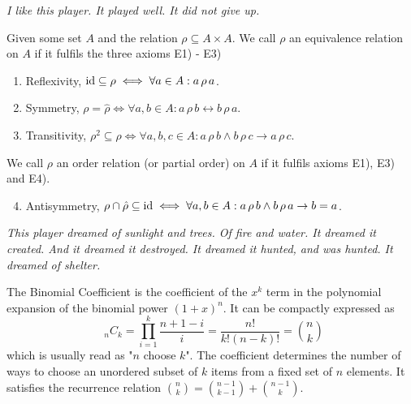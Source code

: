 \bigskip
\textit{I like this player. It played well. It did not give up.}
\bigskip

\begin{tcolorbox}[
	adjusted title=Equivalence Relation, fonttitle=\bfseries,
	boxrule=0mm, leftrule=1mm, arc=0mm, 
	left=1.75mm, toptitle=0.75mm, bottomtitle=0.25mm,
	colframe=brandblue,
	coltitle=textcol, colbacktitle=textcol!10!pagecol,
	coltext=textcol, colback=textcol!5!pagecol,
]
	\def\EAx<#1>{E#1)}
	Given some set $A$ and the relation $\rho\subseteq A\times A$.
	We call $\rho$ an equivalence relation on $A$ if it fulfils the three axioms \EAx<1> - \EAx<3>
	\begin{enumerate}[label=\EAx<\arabic*>]
		\item Reflexivity, $\operatorname{id}\subseteq\rho \iff \forall a\in A: a\,\rho\,a$.
		\item Symmetry, $\rho=\hat\rho \iff \forall a,b\in A: a\,\rho\,b \leftrightarrow b\,\rho\,a$.
		\item Transitivity, $\rho^2\subseteq\rho \iff \forall a,b,c\in A: a\,\rho\,b \land b\,\rho\,c \rightarrow a\,\rho\,c$.
	\end{enumerate}
	We call $\rho$ an order relation (or partial order) on $A$ if it fulfils axioms \EAx<1>, \EAx<3> and \EAx<4>.
	\begin{enumerate}[label=\EAx<\arabic*>]\setcounter{enumi}{3}
		\item Antisymmetry, $\rho\cap\hat\rho\subseteq\operatorname{id} \iff \forall a,b\in A: a\,\rho\,b \land b\,\rho\,a \rightarrow b=a$.
	\end{enumerate}
\end{tcolorbox}

\bigskip
\textit{This player dreamed of sunlight and trees. Of fire and water. It dreamed it created. And it dreamed it destroyed. It dreamed it hunted, and was hunted. It dreamed of shelter.}
\bigskip

\begin{tcolorbox}[
	enhanced,
	adjusted title=\textbf{Binomial Coefficient},
	frame style image=ETH.jpg,
	opacityback=0.80, opacitybacktitle=0.20,
	colback=blue!5!white, colframe=blue!75!black,
]
	The Binomial Coefficient is the coefficient of the $x^k$ term in the polynomial expansion of the binomial power $(1+x)^n$. %
	It can be compactly expressed as
	\[ \phantom{1}_nC_k = \prod_{i=1}^k \frac{n+1-i}{i} = \frac{n!}{k!(n-k)!} = \binom{n}{k} \]
	which is usually read as "$n$ choose $k$".
	The coefficient determines the number of ways to choose an unordered subset of $k$ items from a fixed set of $n$ elements.
	It satisfies the recurrence relation $\binom{n}{k} = \binom{n-1}{k-1} + \binom{n-1}{k}$. %
\end{tcolorbox}

